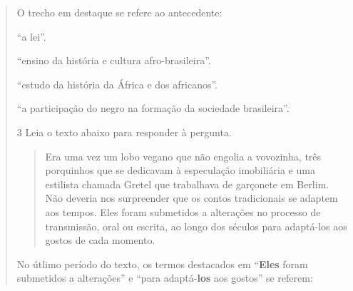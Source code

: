 \begin{quote}
{O trecho em destaque se refere ao antecedente:

\begin{escolha}
  
  \item ``a lei''.
  
  \item ``ensino da história e cultura afro-brasileira''.
  
  \item ``estudo da história da África e dos africanos''.
  
  \item ``a participação do negro na formação da sociedade brasileira''.

\end{escolha}


\num{3} Leia o texto abaixo para responder à pergunta.

\begin{quote}

Era uma vez um lobo vegano que não engolia a vovozinha, três
porquinhos que se dedicavam à especulação imobiliária e uma estilista
chamada Gretel que trabalhava de garçonete em Berlim. Não deveria nos
surpreender que os contos tradicionais se adaptem aos tempos. Eles foram
submetidos a alterações no processo de transmissão, oral ou escrita, ao
longo dos séculos para adaptá-los aos gostos de cada momento.

\end{quote}


No útlimo período do texto, os termos destacados em ``\textbf{Eles} foram
submetidos a alterações'' e ``para adaptá-\textbf{los} aos gostos'' se referem:

\begin{escolha}


\end{escolha}}
\end{quote}
